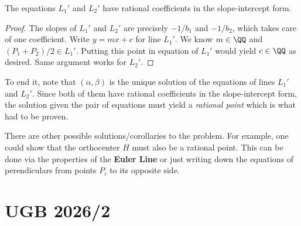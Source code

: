 \documentclass[numbers=endperiod, 11pt]{scrartcl}
\begin{document}
\begin{sol}
	\begin{claim*}
		The equations $L_1'$ and $L_2'$ have rational 
		coefficients in the slope-intercept form.
	\end{claim*}
	\begin{proof}
		The slopes of $L_1'$ and $L_2'$ are precisely 
		$-1/b_1$ and $-1/b_2$, which takes care of
		one coefficient. Write $y = mx + c$ for line $L_1'$.
		We know $m \in \QQ$ and $(P_1 + P_2)/2 \in L_1'$. 
		Putting this point in equation of $L_1'$ would 
		yield $c \in \QQ$ as desired. Same argument
		works for $L_2'$.
	\end{proof}
	
	To end it, note that $(\alpha, \beta)$ is the unique
	solution of the equations of lines $L_1'$ and $L_2'$. 
	Since both of them have rational coefficients in 
	the slope-intercept form, the solution given 
	the pair of equations must yield a \emph{rational
	point} which is what had to be proven.
\end{sol}
\begin{remark*}
	There are other possible solutions/corollaries to the
	problem. For example, one could show that the
	orthocenter $H$ must also be a rational point. This 
	can be done via the properties of the
	\textbf{Euler Line} or just writing down the equations
	of perendiculars from points $P_i$ to its opposite
	side.
\end{remark*}

\newpage

\section{UGB 2026/2}
\end{document}
